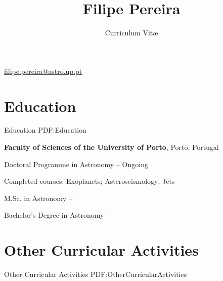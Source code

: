 \documentclass[letterpaper,10pt,oneside]{article}
\newcommand{\CVAuthor}{Filipe Pereira}
\newcommand{\CVTitle}{Curriculum Vit\ae}
\newcommand{\CVWebpage}{http://www.example.com/johndoe}
\begin{document}

\title{\CVAuthor}
\subtitle{\CVTitle}

\begin{subtitle}
\par
\href{mailto:filipe.pereira@astro.up.pt}
{filipe.pereira@astro.up.pt}
\end{subtitle}

\begin{body}


\section
{Education}
{Education}
{PDF:Education}

{\textbf{Faculty of Sciences of the University of Porto}},
Porto, Portugal

\GapNoBreak
\BulletItem
Doctoral Programme in Astronomy
\hfill
{} --
Ongoing
\begin{detail}
\SubBulletItem
Completed courses: Exoplanets; Asteroseismology; Jets
\end{detail}

\GapNoBreak
\BulletItem
M.Sc. in Astronomy
\hfill
{} --


\GapNoBreak
\BulletItem
Bachelor's Degree in Astronomy
\hfill
{} --


\section
{Other Curricular Activities}
{Other Curricular Activities}
{PDF:OtherCurricularActivities}


\end{body}
\end{document}
